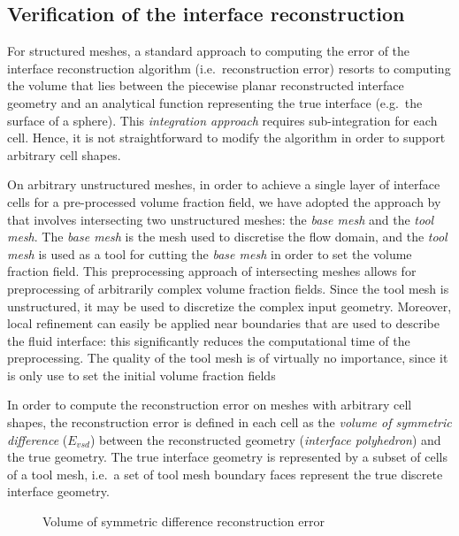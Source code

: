 \subsection{Verification of the interface reconstruction}

For structured meshes, a standard approach to computing the error of the
interface reconstruction algorithm (i.e.\ reconstruction error) resorts to
computing the volume that lies between the piecewise planar reconstructed
interface geometry and an analytical function representing the true interface
(e.g.\ the surface of a sphere).  This \emph {integration approach} requires
sub-integration for each cell.  Hence, it is not straightforward to modify the
algorithm in order to support arbitrary cell shapes.  

On arbitrary unstructured meshes, in order to achieve a single layer of
interface cells for a pre-processed volume fraction field, we have adopted the
approach by \citet{AhnShashkov2009} that involves intersecting two unstructured
meshes: the \emph{base mesh} and the \emph{tool mesh}. The \emph{base mesh} is
the mesh used to discretise the flow domain, and the \emph{tool mesh} is used
as a tool for cutting the \emph{base mesh} in order to set the volume fraction
field. This preprocessing approach of intersecting meshes allows for
preprocessing of arbitrarily complex volume fraction fields. Since the tool
mesh is unstructured, it may be used to discretize the complex input geometry.
Moreover, local refinement can easily be applied near boundaries that are used
to describe the fluid interface: this significantly reduces the computational
time of the preprocessing. The quality of the tool mesh is of virtually no
importance, since it is only use to set the initial volume fraction fields

In order to compute the reconstruction error on meshes with arbitrary cell
shapes, the reconstruction error is defined in each cell as the \emph{volume of
symmetric difference} ($E_{vsd}$) between the reconstructed geometry
(\emph{interface polyhedron}) and the true geometry. The true interface
geometry is represented by a subset of cells of a tool mesh, i.e.\ a set of
tool mesh boundary faces represent the true discrete interface geometry. 

\begin{figure}
   \centering
   \def\svgwidth{0.6\columnwidth}
   {\footnotesize
       
   }
   \caption{Volume of symmetric difference reconstruction error}
   \label{fig:volSymmDiff}
\end{figure}

